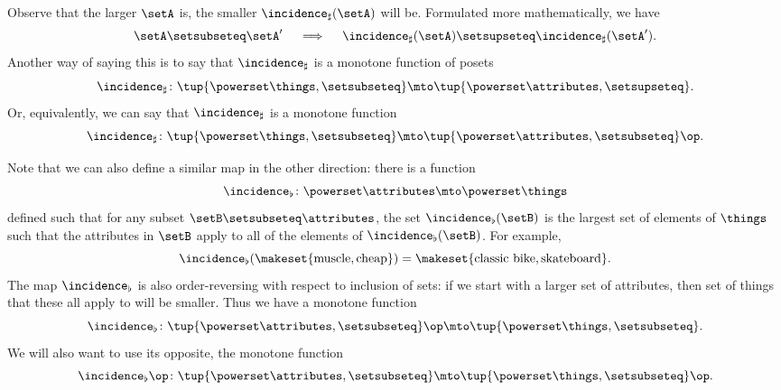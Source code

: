 Observe that the larger $\setA$ is, the smaller $\incidence_\sharp(\setA)$ will be.
Formulated more mathematically, we have
\begin{equation}\label{eq:fca-example-pushforward-7}
    \setA \setsubseteq \setA' \quad \implies \quad \incidence_\sharp(\setA) \setsupseteq \incidence_\sharp(\setA').
\end{equation}
Another way of saying this is to say that $\incidence_\sharp$ is a monotone function of posets
\begin{equation}\label{eq:fca-example-pushforward-8}
    \incidence_\sharp \colon \tup{\powerset \things, \setsubseteq} \mto \tup{\powerset \attributes, \setsupseteq}.
\end{equation}
Or, equivalently, we can say that $\incidence_\sharp$ is a monotone function
\begin{equation}\label{eq:fca-example-pushforward-9}
    \incidence_\sharp \colon \tup{\powerset \things, \setsubseteq} \mto \tup{\powerset \attributes, \setsubseteq}\op.
\end{equation}

Note that we can also define a similar map in the other direction: there is a function
\begin{equation}\label{eq:fca-example-pullback-1}
    \incidence_\flat \colon \powerset \attributes \mto \powerset \things
\end{equation}
defined such that for any subset $\setB \setsubseteq \attributes$, the set $\incidence_\flat(\setB)$ is the largest set of elements of $\things$ such that the attributes in $\setB$ apply to all of the elements of $\incidence_\flat(\setB)$.
For example,
\begin{equation}\label{eq:fca-example-pullback-2}
    \incidence_\flat(\makeset{\text{muscle}, \text{cheap}}) = \makeset{\text{classic bike}, \text{skateboard}}.
\end{equation}
The map $\incidence_\flat$ is also order-reversing with respect to inclusion of sets: if we start with a larger set of attributes, then set of things that these all apply to will be smaller.
Thus we have a monotone function
\begin{equation}\label{eq:fca-example-pullback-3}
    \incidence_\flat \colon \tup{\powerset \attributes, \setsubseteq}\op \mto \tup{\powerset \things, \setsubseteq}.
\end{equation}
We will also want to use its opposite, the monotone function
\begin{equation}\label{eq:fca-example-pullback-4}
    \incidence_\flat\op \colon \tup{\powerset \attributes, \setsubseteq} \mto \tup{\powerset \things, \setsubseteq}\op.
\end{equation}

